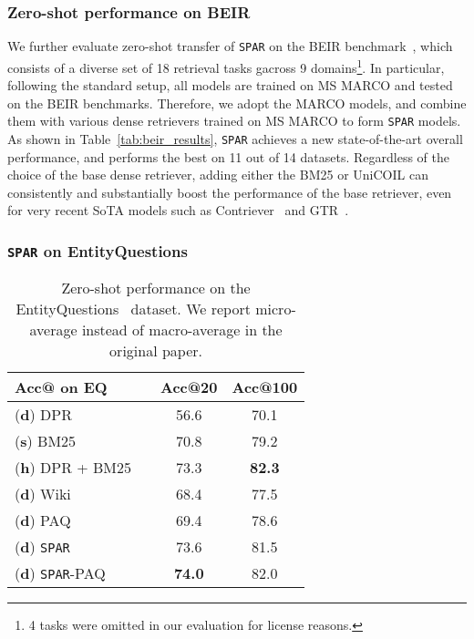 \documentclass[11pt]{article}
\newcommand{\spar}{\texttt{SPAR}\xspace}
\newcommand{\lexmodelsymbol}{\xspace}
\begin{document}
\subsubsection{Zero-shot performance on BEIR}\label{sec:discussion:beir}

We further evaluate zero-shot transfer of \spar{} on the BEIR benchmark~\cite{thakur2021beir}, which consists of a diverse set of 18 retrieval tasks gacross 9 domains\footnote{4 tasks were omitted in our evaluation for license reasons.}.
In particular, following the standard setup, all models are trained on MS MARCO and tested on the BEIR benchmarks.
Therefore, we adopt the MARCO \lexmodelsymbol{} models, and combine them with various dense retrievers trained on MS MARCO to form \spar{} models.
As shown in Table~\ref{tab:beir_results}, \spar{} achieves a new state-of-the-art overall performance, and performs the best on 11 out of 14 datasets.
Regardless of the choice of the base dense retriever, adding either the BM25 or UniCOIL \lexmodelsymbol{} can consistently and substantially boost the performance of the base retriever, even for very recent SoTA models such as Contriever~\cite{izacard2021unsupervised} and GTR~\cite{ni2021large}.

\subsubsection{\spar{} on EntityQuestions}\label{sec:discussion:eq}

\begin{table}[ht]
    \small
    \centering
    \begin{tabular}{l c cc}
    \toprule
    Acc@ on EQ        && Acc@20 & Acc@100 \\
    \midrule
    ({\bf d}) DPR     && 56.6 & 70.1 \\
    ({\bf s}) BM25    && 70.8 & 79.2 \\
    ({\bf h}) DPR + BM25    && 73.3 & \bf 82.3 \\
    \midrule
    ({\bf d}) Wiki \lexmodelsymbol{} && 68.4 & 77.5 \\
    ({\bf d}) PAQ \lexmodelsymbol{} && 69.4 & 78.6 \\
    \midrule
    ({\bf d}) \spar{}     && 73.6 & 81.5 \\
    ({\bf d}) \spar{}-PAQ     && \bf 74.0 & 82.0 \\
    \bottomrule
    \end{tabular}
    \caption{Zero-shot performance on the EntityQuestions~\cite{sciavolino2021simple} dataset. We report micro-average instead of macro-average in the original paper.}
    \label{tab:entityquestions}
\end{table}
 
\end{document}
